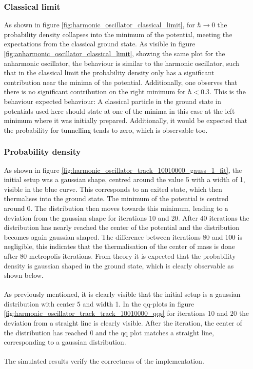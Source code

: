 \documentclass{scrartcl}
\begin{document}
	\subsubsection{Classical limit}
		As shown in figure \ref{fig:harmonic_oscillator_classical_limit}, for $\hbar \rightarrow 0$ the probability density collapses into the minimum of the potential, meeting the expectations from the classical ground state.
		As visible in figure \ref{fig:anharmonic_oscillator_classical_limit}, showing the same plot for the anharmonic oscillator, the behaviour is similar to the harmonic oscillator, such that in the classical limit the probability density only has a significant contribution near the minima of the potential.
		Additionally, one observes that there is no significant contribution on the right minimum for $\hbar < 0.3$.
		This is the behaviour expected behaviour:
		A classical particle in the ground state in potentials used here should state at one of the minima in this case at the left minimum where it was initially prepared.
		Additionally, it would be expected that the probability for tunnelling tends to zero, which is observable too.

	\subsubsection{Probability density}
		As shown in figure \ref{fig:harmonic_oscillator_track_10010000_gauss_1_fit}, the initial setup was a gaussian shape, centred around the value 5 with a width of 1, visible in the blue curve.
		This corresponds to an exited state, which then thermalises into the ground state.
		The minimum of the potential is centred around 0.
		The distribution then moves towards this minimum, leading to a deviation from the gaussian shape for iterations 10 and 20.
		After 40 iterations the distribution has nearly reached the center of the potential and the distribution becomes again gaussian shaped.
		The difference between iterations 80 and 100 is negligible, this indicates that the thermalisation of the center of mass is done after 80 metropolis iterations.
		From theory it is expected that the probability density is gaussian shaped in the ground state, which is clearly observable as shown below.
		\\\\
		As previously mentioned, it is clearly visible that the initial setup is a gaussian distribution with center 5 and width 1.
		In the qq-plots in figure \ref{fig:harmonic_oscillator_track_track_10010000_qqs} for iterations 10 and 20 the deviation from a straight line is clearly visible.
		After the  iteration, the center of the distribution has reached 0 and the qq plot matches a straight line, corresponding to a gaussian distribution.
		\\\\
		The simulated results verify the correctness of the implementation.
\end{document}
